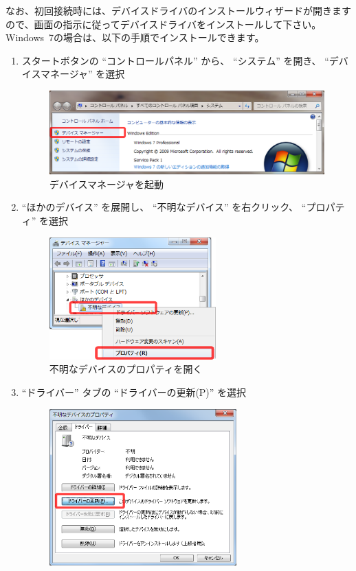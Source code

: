 \documentclass[11pt,a4j,openany,fleqn]{jbook}
\begin{document}
なお、初回接続時には、デバイスドライバのインストールウィザードが開きますので、画面の指示に従ってデバイスドライバをインストールして下さい。
Windows~7の場合は、以下の手順でインストールできます。
\begin{enumerate}
	\item スタートボタンの ``コントロールパネル'' から、 ``システム'' を開き、 ``デバイスマネージャ'' を選択
		\begin{figure}[H]
			\centering\includegraphics[width=122mm]{windriver-install.3.system.eps}
			\caption{デバイスマネージャを起動}
			\label{fig:windriver.system}
		\end{figure}
	\item ``ほかのデバイス'' を展開し、 ``不明なデバイス'' を右クリック、 ``プロパティ'' を選択
		\begin{figure}[H]
			\centering\includegraphics[width=64mm]{windriver-install.4.device_man.eps}
			\caption{不明なデバイスのプロパティを開く}
			\label{fig:windriver.device_man}
		\end{figure}
	\item ``ドライバー'' タブの ``ドライバーの更新(P)'' を選択
		\begin{figure}[H]
			\centering\includegraphics[width=72mm]{windriver-install.5.device_prop.eps}

\end{figure}
\end{enumerate}
\end{document}
